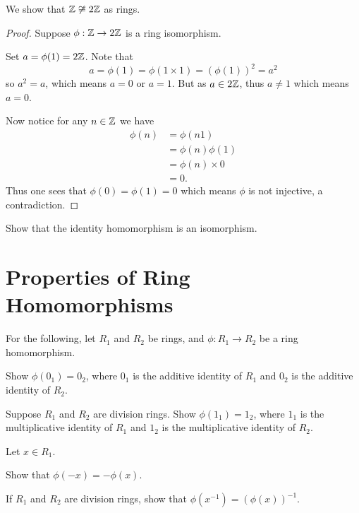 \begin{example}
    We show that $\mathbb{Z} \not\cong 2\mathbb{Z}$ as rings.

    \begin{proof}
        Suppose $\phi: \mathbb{Z} \to 2\mathbb{Z}$ is a ring isomorphism.

        Set $a = \phi(1) = 2\mathbb{Z}$. Note that
        \[
            a = \phi(1) = \phi(1\times1) = (\phi(1))^2 = a^2
        \]
        so $a^2 = a$, which means $a = 0$ or $a = 1$. But as $a \in 2\mathbb{Z}$, thus $a \neq 1$ which means $a = 0$.

        Now notice for any $n \in \mathbb{Z}$ we have
        \begin{align*}
            \phi(n) &= \phi(n1)\\
            &= \phi(n)\phi(1)\\
            &= \phi(n) \times 0\\
            &= 0.
        \end{align*}
        Thus one sees that $\phi(0) = \phi(1) = 0$ which means $\phi$ is not injective, a contradiction.
    \end{proof}
\end{example}
\begin{exercise}\label{exercise-identity-homomorphism-is-an-isomorphism}
    Show that the identity homomorphism is an isomorphism.
\end{exercise}

\newpage

\section{Properties of Ring Homomorphisms}
For the following, let $R_1$ and $R_2$ be rings, and $\phi: R_1 \to R_2$ be a ring homomorphism.

\begin{exercise}\label{exercise-image-of-additive-identity-is-additive-identity}
    Show $\phi(0_1) = 0_2$, where $0_1$ is the additive identity of $R_1$ and $0_2$ is the additive identity of $R_2$.
\end{exercise}

\begin{exercise}
    Suppose $R_1$ and $R_2$ are division rings. Show $\phi(1_1) = 1_2$, where $1_1$ is the multiplicative identity of $R_1$ and $1_2$ is the multiplicative identity of $R_2$.
\end{exercise}

\begin{exercise}
    Let $x \in R_1$.
    \begin{partquestions}{\alph*}
        \item Show that $\phi(-x) = -\phi(x)$.
        \item If $R_1$ and $R_2$ are division rings, show that $\phi(x^{-1}) = (\phi(x))^{-1}$.
    \end{partquestions}
\end{exercise}

